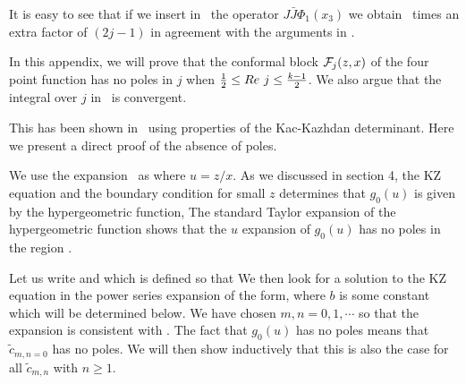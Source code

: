 It is easy to see that if we insert in \targettwopointagain\ the
operator $J\bar J \Phi_1(x_3)$ we obtain \targettwopointagain\ times
an extra factor of $(2j-1)$ in agreement with the arguments in
\gklast .


In this appendix, we will prove that the conformal block
${\cal F}_j(z,x)$
of the four point function has no poles in $j$ when  ${1\over 2}
 \leq Re~j \leq {k-1 \over 2}$.
We also argue that the integral
over $j$ in \expres\ is convergent.


This has been shown in \teschnersecond\ using properties
of the Kac-Kazhdan determinant. Here we present a direct
proof of the absence of poles.

We use the expansion
\regionone\  as
\eqn{}
where $u = z/x$. As we discussed in section 4,
the KZ equation and the boundary condition for small $z$
determines that $g_0(u)$ is given by the hypergeometric function,
\eqn{}
The standard Taylor expansion of the hypergeometric function
shows that
the $u$ expansion of $g_0(u)$ has
no poles in the region .

 Let us write
\eqn{}
and
\eqn{}
which is defined so that
\eqn{}
We then look for a solution to the KZ equation
in the power series expansion of the form,
\eqn{}
where $b$ is some constant which will be determined below.
We have chosen $m, n = 0, 1, \cdots$
so that the expansion is consistent with  \smallz \whatfn \regionone .
The fact that $g_0(u)$ has no poles means that
$\tilde{c}_{m,n=0}$ has no poles. We will then show
inductively that this is also the case for all $\tilde{c}_{m,n}$
with $n\geq 1$.

